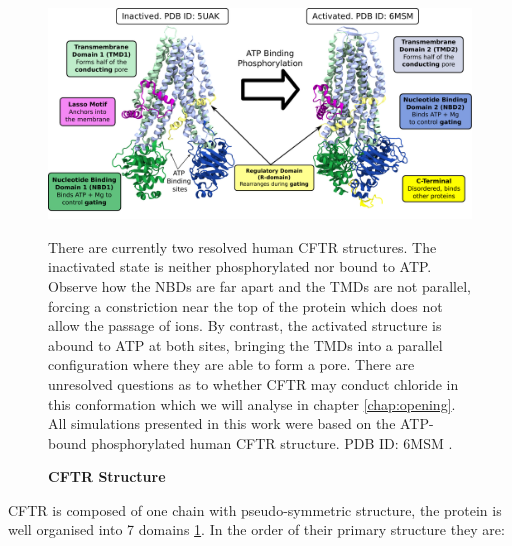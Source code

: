 \begin{figure}
	\begin{center}
	\includegraphics[width=\textwidth]{figures/CFTR_structure.pdf}
	\end{center}
	\label{CFTR_structure_domains}
	\captionsetup{singlelinecheck = false, justification=raggedright}
	\caption[CFTR Structure] {\textbf{CFTR Structure}}{There are currently two resolved human CFTR structures. The inactivated state is neither phosphorylated nor bound to ATP. Observe how the NBDs are far apart and the TMDs are not parallel, forcing a constriction near the top of the protein which does not allow the passage of ions. By contrast, the activated structure is abound to ATP at both sites, bringing the TMDs into a parallel configuration where they are able to form a pore. There are unresolved questions as to whether CFTR may conduct chloride in this conformation which we will analyse in chapter \ref{chap:opening}. All simulations presented in this work were based on the ATP-bound phosphorylated human CFTR structure. PDB ID: 6MSM \cite{zhang2018}.} 

\end{figure}
CFTR is composed of one chain with pseudo-symmetric structure, the protein is well organised into 7 domains \ref{CFTR_structure_domains}. In the order of their primary structure they are: 

